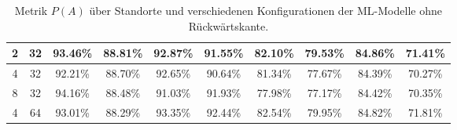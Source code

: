 \begin{table}[h!]
\begin{tabular}{ | c | c | c | c | c | c | c | c | c | c | }
        2 & 32 & 93.46\% & 88.81\% & 92.87\% & 91.55\% & 82.10\% & 79.53\% & 84.86\% & 71.41\% \\\hline
        4 & 32 & 92.21\% & 88.70\% & 92.65\% & 90.64\% & 81.34\% & 77.67\% & 84.39\% & 70.27\% \\\hline
        8 & 32 & 94.16\% & 88.48\% & 91.03\% & 91.93\% & 77.98\% & 77.17\% & 84.42\% & 70.35\% \\\hline
        4 & 64 & 93.01\% & 88.29\% & 93.35\% & 92.44\% & 82.54\% & 79.95\% & 84.82\% & 71.81\% \\\hline
    \end{tabular}
    \caption{Metrik $P(A)$ über Standorte und verschiedenen Konfigurationen der ML-Modelle ohne Rückwärtskante.}
    \label{tab:predictions_wo_feedback_edge_by_acc}
\end{table}
